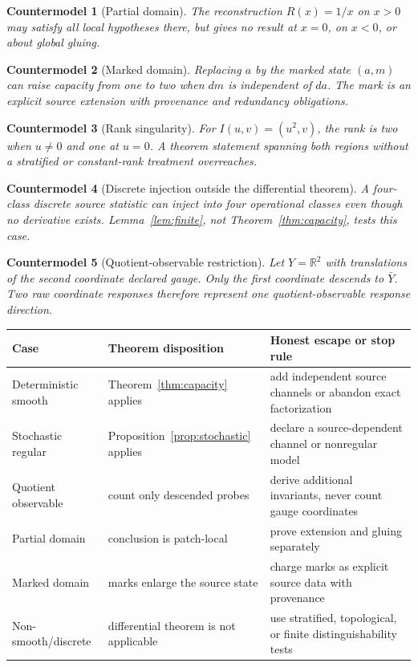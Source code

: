 \documentclass[11pt]{article}
\newtheorem{example}{Countermodel}
\newcommand{\R}{\mathbb{R}}
\begin{document}
\begin{example}[Partial domain]
The reconstruction \(R(x)=1/x\) on \(x>0\) may satisfy all local hypotheses
there, but gives no result at \(x=0\), on \(x<0\), or about global gluing.
\end{example}

\begin{example}[Marked domain]
Replacing \(a\) by the marked state \((a,m)\) can raise capacity from one to
two when \(dm\) is independent of \(da\).  The mark is an explicit source
extension with provenance and redundancy obligations.
\end{example}

\begin{example}[Rank singularity]
For \(I(u,v)=(u^2,v)\), the rank is two when \(u\neq0\) and one at \(u=0\).
A theorem statement spanning both regions without a stratified or
constant-rank treatment overreaches.
\end{example}

\begin{example}[Discrete injection outside the differential theorem]
A four-class discrete source statistic can inject into four operational
classes even though no derivative exists.  Lemma~\ref{lem:finite}, not
Theorem~\ref{thm:capacity}, tests this case.
\end{example}

\begin{example}[Quotient-observable restriction]
Let \(Y=\R^2\) with translations of the second coordinate declared gauge.
Only the first coordinate descends to \(\bar Y\).  Two raw coordinate
responses therefore represent one quotient-observable response direction.
\end{example}

\begin{center}
\begin{tabular}{p{}p{}p{}}
\toprule
Case & Theorem disposition & Honest escape or stop rule\\
\midrule
Deterministic smooth & Theorem~\ref{thm:capacity} applies & add independent
source channels or abandon exact factorization\\
Stochastic regular & Proposition~\ref{prop:stochastic} applies & declare a
source-dependent channel or nonregular model\\
Quotient observable & count only descended probes & derive additional
invariants, never count gauge coordinates\\
Partial domain & conclusion is patch-local & prove extension and gluing
separately\\
Marked domain & marks enlarge the source state & charge marks as explicit
source data with provenance\\
Non-smooth/discrete & differential theorem is not applicable & use stratified,
topological, or finite distinguishability tests\\
\bottomrule
\end{tabular}
\end{center}
\end{document}
